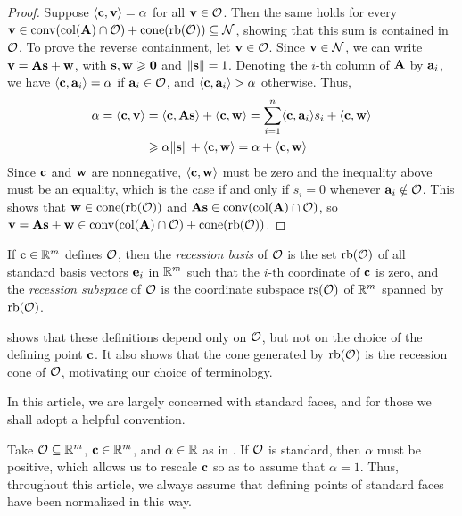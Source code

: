 \documentclass{amsart}
\begin{document}
\begin{proof}
   Suppose $\langle \mathbf{c}, \mathbf{v} \rangle = \alpha$ for all $\mathbf{v} \in \mathcal{O}$.
   Then the same holds for every $\mathbf{v} \in\operatorname{conv}( \operatorname{col}(\mathbf{A}) \cap \mathcal{O} ) + \operatorname{cone}(\operatorname{rb}(\mathcal{O})) \subseteq \mathcal{N}$, showing that this sum is contained in  $\mathcal{O}$.
   To prove the reverse containment, let $\mathbf{v} \in \mathcal{O}$.
   Since $\mathbf{v} \in \mathcal{N}$, we can write $\mathbf{v} = \mathbf{A} \mathbf{s} + \mathbf{w}$, with $\mathbf{s}, \mathbf{w}\geqslant \mathbf{0}$ and $\| \mathbf{s} \| = 1$.
   Denoting the $i$-th column of $\mathbf{A}$ by $\mathbf{a}_i$, we have $\langle \mathbf{c}, \mathbf{a}_i \rangle = \alpha$ if $\mathbf{a}_i \in \mathcal{O}$, and $\langle \mathbf{c}, \mathbf{a}_i \rangle > \alpha$ otherwise.
   Thus, 
   \begin{align*}
     \alpha = \langle \mathbf{c}, \mathbf{v} \rangle &= \langle \mathbf{c}, \mathbf{A}\mathbf{s} \rangle + \langle \mathbf{c}, \mathbf{w} \rangle
     = \sum_{i=1}^n \langle \mathbf{c}, \mathbf{a}_i \rangle s_i + \langle \mathbf{c}, \mathbf{w} \rangle\\
     &\geqslant \alpha \| \mathbf{s} \| + \langle \mathbf{c}, \mathbf{w} \rangle = \alpha + \langle \mathbf{c}, \mathbf{w} \rangle
   \end{align*}
   Since $\mathbf{c}$ and $\mathbf{w}$ are nonnegative, $\langle \mathbf{c}, \mathbf{w} \rangle$ must be zero and the inequality above must be an equality, which is the case if and only if $s_i = 0$ whenever $\mathbf{a}_i \notin \mathcal{O}$.
   This shows that $\mathbf{w} \in \operatorname{cone}(\operatorname{rb}(\mathcal{O}))$ and $\mathbf{A}\mathbf{s} \in \operatorname{conv}(\operatorname{col}(\mathbf{A}) \cap \mathcal{O})$, so $\mathbf{v} = \mathbf{A}\mathbf{s} + \mathbf{w} \in \operatorname{conv}( \operatorname{col}(\mathbf{A}) \cap \mathcal{O} ) + \operatorname{cone}(\operatorname{rb}(\mathcal{O}))$.
\end{proof}

\begin{definition}
   If $\mathbf{c} \in \mathbb{R}^m$ defines $\mathcal{O}$, then the \emph{recession basis} of $\mathcal{O}$ is the set $\operatorname{rb}(\mathcal{O})$ of all standard basis vectors $\mathbf{e}_i$ in $\mathbb{R}^m$ such that the $i$-th coordinate of $\mathbf{c}$ is zero, and the \emph{recession subspace} of $\mathcal{O}$ is the coordinate subspace $\operatorname{rs}(\mathcal{O})$ of $\mathbb{R}^m$ spanned by $\operatorname{rb}(\mathcal{O})$.
\end{definition}

 shows that these definitions depend only on $\mathcal{O}$, but not on the choice of the defining point $\mathbf{c}$.
It also shows that the cone generated by $\operatorname{rb}(\mathcal{O})$ is the recession cone of $\mathcal{O}$, motivating our choice of terminology.

In this article, we are largely concerned with standard faces, and for those we shall adopt a helpful convention.

\begin{convention}
\label{alpha=1: convention}
Take $\mathcal{O} \subseteq \mathbb{R}^m$, $\mathbf{c} \in \mathbb{R}^m$, and $\alpha \in \mathbb{R}$ as in .
If $\mathcal{O}$ is standard, then $\alpha$ must be positive, which allows us to rescale $\mathbf{c}$ so as to assume that $\alpha = 1$.
Thus, throughout this article, we always assume that defining points of standard faces have been normalized in this way.
\end{convention}
\end{document}
